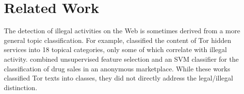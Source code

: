 \documentclass[11pt,a4paper,table]{article}
\newcommand{\oa}[1]{\footnote{\color{red}OA: #1}}
\newcommand{\es}[1]{\footnote{\color{purple}ES: #1}}
\begin{document}
  
  
	
%   
%   
%   
%
%
%
%

\section{Related Work} \label{sec:related_work}

The detection of illegal activities on the Web is sometimes derived from a more general topic classification. For example, \citet{Biryukov14}
  classified the content of Tor hidden services into 18 topical categories, only some of which correlate with illegal activity.   
  \citet{GraczykKinningham15} combined unsupervised feature selection and an SVM classifier for the classification of drug sales in an anonymous marketplace.
  While these works classified Tor texts into classes, they did not directly address the legal/illegal distinction.

\end{document}
